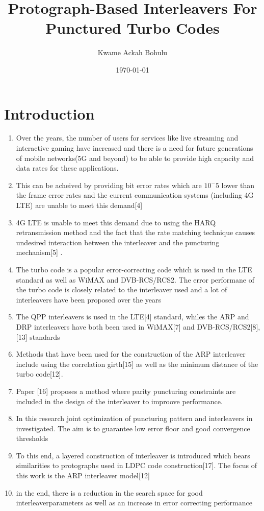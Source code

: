 \documentclass[fontsize=12pt]{article}
\title{Protograph-Based Interleavers For Punctured Turbo Codes}
\author{Kwame Ackah Bohulu}
\date{\today}
\begin{document}
\maketitle

\newpage


\section{Introduction}
\begin{enumerate}
\item Over the years, the number of users for services like live streaming and interactive gaming have increased and there is a need for future generations of mobile networks(5G and beyond) to be able to provide high capacity and data rates for these applications.

\item This can be acheived by providing bit error rates which are $10^-5$ lower than the frame error rates and the current communication systems (including 4G LTE) are  unable to meet this demand[4]

\item 4G LTE is unable to meet this demand due to using the HARQ retransmission method and the fact that the rate matching technique causes undesired interaction between the interleaver and the puncturing mechanism[5] .

\item The turbo code is a popular error-correcting code which is used in the LTE standard as well as WiMAX and DVB-RCS/RCS2. The error performane of the turbo code is closely related to the interleaver used and a lot of interleavers have been proposed over the years

\item The QPP interleavers is used in the LTE[4] standard, whiles the ARP and DRP interleavers have both been used in WiMAX[7] and DVB-RCS/RCS2[8],[13] standards

\item Methods that have been used for the construction of the ARP interleaver include using the correlation girth[15] as well as the minimum distance of the turbo code[12].

\item Paper [16] proposes a method where parity puncturing constraints are included in the design of the interleaver to improove performance.

\item In this research joint optimization of puncturing pattern and interleavers in investigated. The aim is to guarantee low error floor and good convergence thresholds

\item To this end, a layered construction of interleaver is introduced which bears similarities to protographs used in LDPC code construction[17]. The focus of this work is the ARP interleaver model[12]

\item in the end, there is a reduction in the search space for good interleaverparameters as well as an increase in error correcting performance
\end{enumerate}
\end{document}
